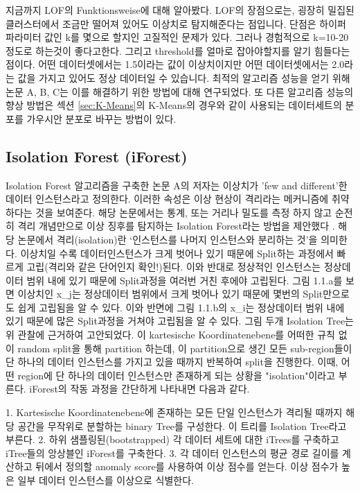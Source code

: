                 지금까지 LOF의 Funktionsweise에 대해 알아봤다. LOF의 장점으로는, 굉장히 밀집된 클러스터에서 조금만 떨어져 있어도 이상치로 탐지해준다는 점입니다. 단점은 하이퍼파라미터 값인 k를 몇으로 할지인 고질적인 문제가 있다. 그러나 경험적으로 k=10-20 \cite{Breunig00} 정도로 하는것이 좋다고한다. 그리고 threshold를 얼마로 잡아야할지를 알기 힘들다는 점이다. 어떤 데이터셋에서는 1.5이라는 값이 이상치이지만 어떤 데이터셋에서는 2.0라는 값을 가지고 있어도 정상 데이터일 수 있습니다. 최적의 알고리즘 성능을 얻기 위해 논문 A, B, C는 이를 해결하기 위한 방법에 대해 연구되었다. 또 다른 알고리즘 성능의 향상 방법은 섹션 \ref{sec:K-Means}의 K-Means의 경우와 같이 사용되는 데이터세트의 분포를 가우시안 분포로 바꾸는 방법이 있다.
                
            \subsection{Isolation Forest (iForest)}
                Isolation Forest 알고리즘을 구축한 논문 A의 저자는 이상치가 'few and different'한 데이터 인스턴스라고 정의한다. 이러한 속성은 이상 현상이 격리라는 메커니즘에 취약하다는 것을 보여준다. 해당 논문에서는 통계, 또는 거리나 밀도를 측정 하지 않고 순전히 격리 개념만으로 이상 징후를 탐지하는 Isolation Forest라는 방법을 제안했다 \cite{Liu08}. 해당 논문에서 격리(isolation)란 ‘인스턴스를 나머지 인스턴스와 분리하는 것’을 의미한다. 이상치일 수록 데이터인스턴스가 크게 벗어나 있기 때문에 Split하는 과정에서 빠르게 고립(격리와 같은 단어인지 확인!)된다. 이와 반대로 정상적인 인스턴스는 정상데이터 범위 내에 있기 때문에 Split과정을 여러번 거친 후에야 고립된다. 그림 1.1.a를 보면 이상치인 x_j는 정상데이터 범위에서 크게 벗어나 있기 때문에 몇번의 Split만으로도 쉽게 고립됨을 알 수 있다. 이와 반면에 그림 1.1.b의 x_i는 정상데이터 범위 내에 있기 때문에 많은 Split과정을 거쳐야 고립됨을 알 수 있다.
                그림 두개 \cite{Liu08}
                Isolation Tree는 위 관찰에 근거하여 고안되었다. 이 kartesische Koordinatenebene를 어떠한 규칙 없이 random split을 통해 partition 하는데, 이 partition으로 생긴 모든 sub-region들이 단 하나의 데이터 인스턴스를 가지고 있을 때까지 반복하여 split을 진행한다. 이때, 어떤 region에 단 하나의 데이터 인스턴스만 존재하게 되는 상황을 "isolation"이라고 부른다. iForest의 작동 과정을 간단하게 나타내면 다음과 같다.

                    1. Kartesische Koordinatenebene에 존재하는 모든 단일 인스턴스가 격리될 때까지 해당 공간을 무작위로 분할하는 binary Tree를 구성한다. 이 트리를 Isolation Tree라고 부른다.
                    2. 하위 샘플링된(bootstrapped) 각 데이터 세트에 대한 iTrees를 구축하고 iTree들의 앙상블인 iForest를 구축한다.
                    3. 각 데이터 인스턴스의 평균 경로 길이를 계산하고 뒤에서 정의할 anomaly score를 사용하여 이상 점수를 얻는다. 이상 점수가 높은 일부 데이터 인스턴스를 이상으로 식별한다.

